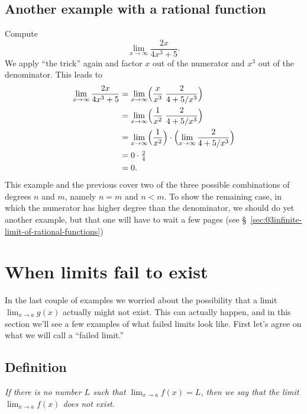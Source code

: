   
\subsection{Another example with a rational function} 
Compute
\[
\lim_{x\to\infty} \frac {2x}{4x^3+5}.
\]
We apply ``the trick'' again and factor $x$ out of the numerator and
$x^3$ out of the denominator.
This leads to
\begin{align*}
  \lim_{x\to\infty} \frac {2x}{4x^3+5}
  &=\lim_{x\to\infty} \Bigl(\frac{x}{x^3}\;\frac{2}{4+5/x^3}\Bigr)\\
  &=\lim_{x\to\infty} \Bigl(\frac{1}{x^2}\;\frac{2}{4+5/x^3}\Bigr)\\
  &=\lim_{x\to\infty} \Bigl(\frac{1}{x^2}\Bigr)\cdot \Bigl(\lim_{x\to\infty}\frac{2}{4+5/x^3}\Bigr)\\
  &=0\cdot \tfrac24\\
  &=0.
\end{align*}
This example and the previous cover two of the three possible
combinations of degrees $n$ and $m$, namely $n=m$ and $n<m$.  To show
the remaining case, in which the numerator has higher degree than the
denominator, we should do yet another example, but that one will have
to wait a few pages (see
\S~\ref{sec:03infinite-limit-of-rational-functions})


\section{When limits fail to exist} 
In the last couple of examples we worried about the possibility that a
limit $\lim_{x\to a}g(x)$ actually might not exist.  This can actually
happen, and in this section we'll see a few examples of what failed limits
look like.  First let's agree on what we will call a ``failed limit.''

\subsection{Definition} 
\itshape
If there is no number $L$ such that $\lim_{x\to a}f(x) = L$, then we say
that the limit $\lim_{x\to a}f(x)$ does not exist.  \upshape


